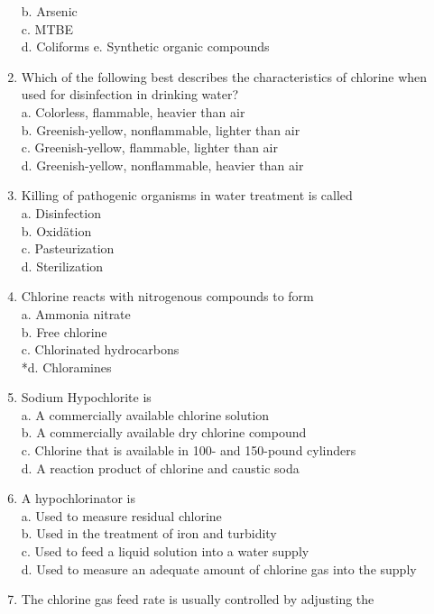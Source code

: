 \begin{enumerate}[1.]
b. Arsenic\\
c. MTBE\\
d. Coliforms e. Synthetic organic compounds\\
\item Which of the following best describes the characteristics of chlorine when used for disinfection in drinking water?\\
a. Colorless, flammable, heavier than air\\
b. Greenish-yellow, nonflammable, lighter than air\\
c. Greenish-yellow, flammable, lighter than air\\
d. Greenish-yellow, nonflammable, heavier than air\\
\item Killing of pathogenic organisms in water treatment is called\\
a. Disinfection\\
b. Oxidätion\\
c. Pasteurization\\
d. Sterilization\\
\item Chlorine reacts with nitrogenous compounds to form\\
a. Ammonia nitrate\\
b. Free chlorine\\
c. Chlorinated hydrocarbons\\
*d. Chloramines\\
\item Sodium Hypochlorite is\\
a. A commercially available chlorine solution\\
b. A commercially available dry chlorine compound\\
c. Chlorine that is available in 100- and 150-pound cylinders\\
d. A reaction product of chlorine and caustic soda\\
\item A hypochlorinator is\\
a. Used to measure residual chlorine\\
b. Used in the treatment of iron and turbidity\\
c. Used to feed a liquid solution into a water supply\\
d. Used to measure an adequate amount of chlorine gas into the supply\\
\item The chlorine gas feed rate is usually controlled by adjusting the\\

\end{enumerate}
